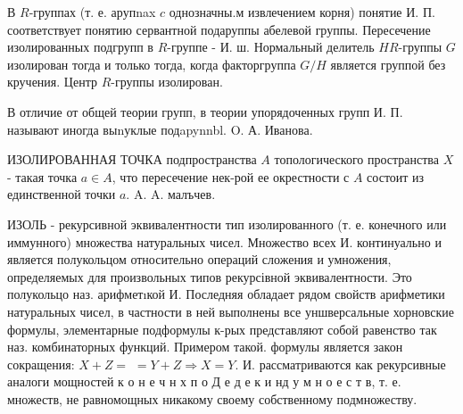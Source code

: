 \documentclass[10pt]{article}
\begin{document}
В $R$-группах (т. е. арупnax $c$ однозначны.м извлечением корня) понятие И. П. соответствует понятию сервантной подаруппы абелевой группы. Пересечение изолированных подгрупп в $R$-группе - И. ш. Нормальный делитель $H R$-группы $G$ изолирован тогда и только тогда, когда факторгруппа $G / H$ является группой без кручения. Центр $R$-группы изолирован.



В отличие от общей теории групп, в теории упорядоченных групп И. П. называют иногда выnуклые подapynnbl. O. А. Иванова.



ИЗОЛИРОВАННАЯ ТОЧКА подпространства $A$ топологического пространства $X$ - такая точка $a \in A$, что пересечение нек-рой ее окрестности с $A$ состоит из единственной точки $a$. A. A. малъчев.



ИЗОЛЬ - рекурсивной эквивалентности тип изолированного (т. е. конечного или иммунного) множества натуральных чисел. Множество всех И. континуально и является полукольцом относительно операций сложения и умножения, определяемых для произвольных типов рекурсівной эквивалентности. Это полукольцо наз. арифметıкой И. Последняя обладает рядом свойств арифметики натуральных чисел, в частности в ней выполнены все уншверсальные хорновские формулы, элементарные подформулы к-рых представляют собой равенство так наз. комбинаторных функций. Примером такой. формулы является закон сокращения: $X+Z=$ $=Y+Z \Rightarrow X=Y$. И. рассматриваются как рекурсивные аналоги мощностей к о н е ч н х п о Д е д е к и нд у м н о е с т в, т. е. множеств, не равномощных никакому своему собственному подмножеству.
\end{document}
